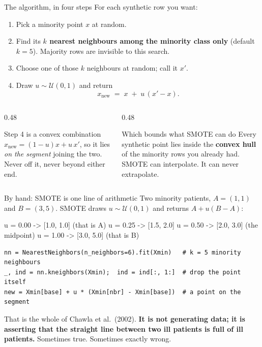 \documentclass[aspectratio=169]{beamer}
\begin{document}
\begin{frame}[shrink=6]{The algorithm, in four steps}
  For each synthetic row you want:
  \vspace{0.2em}
  \begin{enumerate}\small
    \item Pick a minority point $x$ at random.
    \item Find its \textbf{$k$ nearest neighbours among the minority class
      only} (default $k = 5$). Majority rows are invisible to this search.
    \item Choose one of those $k$ neighbours at random; call it $x'$.
    \item Draw $u \sim \mathcal{U}(0,1)$ and return
      \[
        x_{\text{new}} \;=\; x \;+\; u\,(x' - x).
      \]
  \end{enumerate}
  \vspace{0.3em}
  \begin{columns}[T]
    \begin{column}{0.48\textwidth}
      \begin{block}{Step 4 is a convex combination}
        \small $x_{\text{new}} = (1-u)x + u\,x'$, so it lies \emph{on the
        segment} joining the two. Never off it, never beyond either end.
      \end{block}
    \end{column}
    \begin{column}{0.48\textwidth}
      \begin{alertblock}{Which bounds what SMOTE can do}
        \small Every synthetic point lies inside the \textbf{convex hull} of
        the minority rows you already had. SMOTE can interpolate. It can
        never extrapolate.
      \end{alertblock}
    \end{column}
  \end{columns}
\end{frame}

\begin{frame}[fragile,shrink=8]{By hand: SMOTE is one line of arithmetic}
Two minority patients, $A = (1, 1)$ and $B = (3, 5)$. SMOTE draws
$u \sim \mathcal{U}(0,1)$ and returns $A + u(B - A)$:
\begin{outblk}
   u = 0.00  ->  [1.0, 1.0]      (that is A)
   u = 0.25  ->  [1.5, 2.0]
   u = 0.50  ->  [2.0, 3.0]      (the midpoint)
   u = 1.00  ->  [3.0, 5.0]      (that is B)
\end{outblk}
\begin{lstlisting}
nn = NearestNeighbors(n_neighbors=6).fit(Xmin)   # k = 5 minority neighbours
_, ind = nn.kneighbors(Xmin);  ind = ind[:, 1:]  # drop the point itself
new = Xmin[base] + u * (Xmin[nbr] - Xmin[base])  # a point on the segment
\end{lstlisting}
\begin{center}\small
  That is the whole of Chawla et al.\ (2002). \textbf{It is not generating
  data; it is asserting that the straight line between two ill patients is
  full of ill patients.} Sometimes true. Sometimes exactly wrong.
\end{center}
\end{frame}
\end{document}
